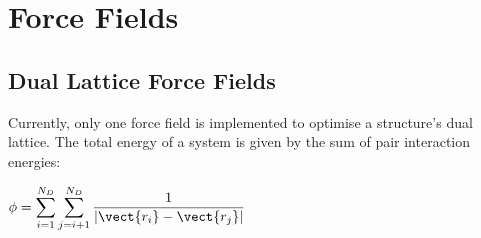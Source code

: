 %
%
%
\section{Force Fields}

\subsection{Dual Lattice Force Fields}

Currently, only one force field is implemented to optimise a structure's dual lattice. The total energy of a system is given by the sum of pair interaction energies:

\begin{center}
$ \displaystyle \phi = \sum_{i=1}^{N_{D}}\sum_{j=i+1}^{N_{D}}\frac{1}{| \vect{r_i}-\vect{r_j}| } $ 
\end{center}



%


    
